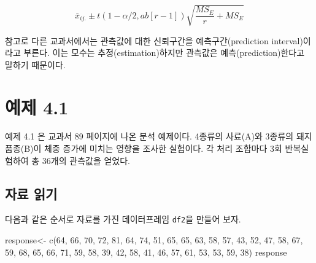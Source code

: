 \documentclass[
]{book}
\newenvironment{Shaded}{\begin{snugshade}}{\end{snugshade}}
\newcommand{\DecValTok}[1]{\textcolor[rgb]{0.00,0.00,0.81}{#1}}
\newcommand{\FunctionTok}[1]{\textcolor[rgb]{0.00,0.00,0.00}{#1}}
\newcommand{\NormalTok}[1]{#1}
\newcommand{\OtherTok}[1]{\textcolor[rgb]{0.56,0.35,0.01}{#1}}
\begin{document}
\[ \bar x_{ij.} \pm t(1-\alpha/2, ab[r-1]) \sqrt{ \frac{MS_E}{r}+MS_E}  \]

참고로 다른 교과서에서는 관측값에 대한 신뢰구간을 예측구간(prediction interval)이라고 부른다. 이는 모수는 추정(estimation)하지만 관측값은 예측(prediction)한다고 말하기 때문이다.

\hypertarget{ex41}{%
\chapter{예제 4.1}\label{ex41}}

예제 4.1 은 교과서 89 페이지에 나온 분석 예제이다. 4종류의 사료(A)와 3종류의 돼지품종(B)이 체중 증가에 미치는 영향을 조사한 실험이다. 각 처리 조합마다 3회 반복실험하여 총 36개의 관측값을 얻었다.

\hypertarget{uxc790uxb8cc-uxc77duxae30-1}{%
\section{자료 읽기}\label{uxc790uxb8cc-uxc77duxae30-1}}

다음과 같은 순서로 자료를 가진 데이터프레임 \texttt{df2}을 만들어 보자.

\begin{Shaded}
\begin{Highlighting}[]
\NormalTok{response}\OtherTok{\textless{}{-}} \FunctionTok{c}\NormalTok{(}\DecValTok{64}\NormalTok{, }\DecValTok{66}\NormalTok{, }\DecValTok{70}\NormalTok{, }\DecValTok{72}\NormalTok{, }\DecValTok{81}\NormalTok{, }\DecValTok{64}\NormalTok{, }
             \DecValTok{74}\NormalTok{, }\DecValTok{51}\NormalTok{, }\DecValTok{65}\NormalTok{, }\DecValTok{65}\NormalTok{, }\DecValTok{63}\NormalTok{, }\DecValTok{58}\NormalTok{,}
             \DecValTok{57}\NormalTok{, }\DecValTok{43}\NormalTok{, }\DecValTok{52}\NormalTok{, }\DecValTok{47}\NormalTok{, }\DecValTok{58}\NormalTok{, }\DecValTok{67}\NormalTok{,}
             \DecValTok{59}\NormalTok{, }\DecValTok{68}\NormalTok{, }\DecValTok{65}\NormalTok{, }\DecValTok{66}\NormalTok{, }\DecValTok{71}\NormalTok{, }\DecValTok{59}\NormalTok{,}
             \DecValTok{58}\NormalTok{, }\DecValTok{39}\NormalTok{, }\DecValTok{42}\NormalTok{, }\DecValTok{58}\NormalTok{, }\DecValTok{41}\NormalTok{, }\DecValTok{46}\NormalTok{,}
             \DecValTok{57}\NormalTok{, }\DecValTok{61}\NormalTok{, }\DecValTok{53}\NormalTok{, }\DecValTok{53}\NormalTok{, }\DecValTok{59}\NormalTok{, }\DecValTok{38}\NormalTok{)}
\NormalTok{response}
\end{Highlighting}
\end{Shaded}
\end{document}
